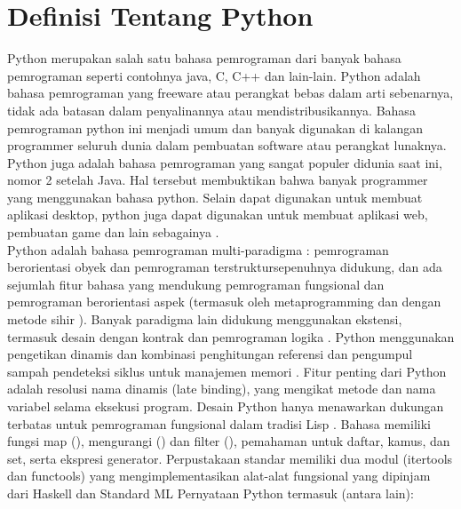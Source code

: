 \section{Definisi Tentang Python}
	Python merupakan salah satu bahasa pemrograman dari banyak bahasa pemrograman seperti contohnya java, C, C++ dan lain-lain. Python adalah bahasa pemrograman yang freeware atau perangkat bebas dalam arti sebenarnya, tidak ada batasan dalam penyalinannya atau mendistribusikannya. Bahasa pemrograman python ini menjadi umum dan banyak digunakan di kalangan programmer seluruh dunia dalam pembuatan software atau perangkat lunaknya. Python juga adalah bahasa pemrograman yang sangat populer didunia saat ini, nomor 2 setelah Java. Hal tersebut membuktikan bahwa banyak programmer yang menggunakan bahasa python. Selain dapat digunakan untuk membuat aplikasi desktop, python juga dapat digunakan untuk membuat aplikasi web, pembuatan game dan lain sebagainya \cite{malikhah2016eksplorasi}.\\

	Python adalah bahasa pemrograman multi-paradigma : pemrograman berorientasi obyek dan pemrograman terstruktursepenuhnya didukung, dan ada sejumlah fitur bahasa yang mendukung pemrograman fungsional dan pemrograman berorientasi aspek (termasuk oleh metaprogramming dan dengan metode sihir ).  Banyak paradigma lain didukung menggunakan ekstensi, termasuk desain dengan kontrak  dan pemrograman logika .
Python menggunakan pengetikan dinamis dan kombinasi penghitungan referensi dan pengumpul sampah pendeteksi siklus untuk manajemen memori . Fitur penting dari Python adalah resolusi nama dinamis (late binding), yang mengikat metode dan nama variabel selama eksekusi program.
Desain Python hanya menawarkan dukungan terbatas untuk pemrograman fungsional dalam tradisi Lisp . Bahasa memiliki fungsi map (), mengurangi () dan filter (), pemahaman untuk daftar, kamus, dan set, serta ekspresi generator. Perpustakaan standar memiliki dua modul (itertools dan functools) yang mengimplementasikan alat-alat fungsional yang dipinjam dari Haskell dan Standard ML 
Pernyataan Python termasuk (antara lain):\\

